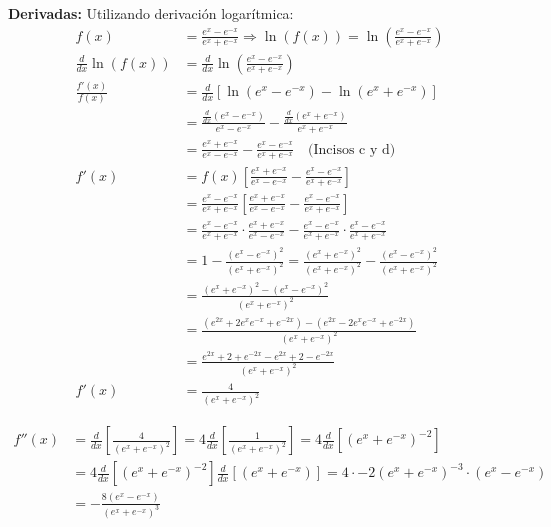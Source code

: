 \documentclass[12pt]{article}
\begin{document}
\begin{enumerate}[\hspace{9px} a)]
        \textbf{Derivadas: } \quad Utilizando derivaci\'on logar\'itmica:
            \begin{align*}
                f(x) &= \frac{e^x-e^{-x}}{e^x+e^{-x}} \Longrightarrow \ln(f(x)) = \ln\left(\frac{e^x-e^{-x}}{e^x+e^{-x}}\right)\\
                \frac{d}{dx}\ln(f(x))&=\frac{d}{dx}\ln\left(\frac{e^x-e^{-x}}{e^x+e^{-x}}\right)\\
                \frac{f'(x)}{f(x)}&=\frac{d}{dx}\left[\ln(e^x-e^{-x})-\ln(e^x+e^{-x})\right]\\
                &=\frac{\frac{d}{dx}(e^x-e^{-x})}{e^x-e^{-x}}-\frac{\frac{d}{dx}(e^x+e^{-x})}{e^x+e^{-x}}\\
                &=\frac{e^x+e^{-x}}{e^x-e^{-x}}-\frac{e^x-e^{-x}}{e^x+e^{-x}} \quad \text{(Incisos c y d)}\\
                f'(x)&= f(x)\left[\frac{e^x+e^{-x}}{e^x-e^{-x}}-\frac{e^x-e^{-x}}{e^x+e^{-x}}\right]\\
                &= \frac{e^x-e^{-x}}{e^x+e^{-x}}\left[\frac{e^x+e^{-x}}{e^x-e^{-x}}-\frac{e^x-e^{-x}}{e^x+e^{-x}}\right]\\
                &= \frac{e^x-e^{-x}}{e^x+e^{-x}}\cdot\frac{e^x+e^{-x}}{e^x-e^{-x}} - \frac{e^x-e^{-x}}{e^x+e^{-x}}\cdot\frac{e^x-e^{-x}}{e^x+e^{-x}}\\
                &= 1- \frac{(e^x-e^{-x})^2}{(e^x+e^{-x})^2} = \frac{(e^x+e^{-x})^2}{(e^x+e^{-x})^2} - \frac{(e^x-e^{-x})^2}{(e^x+e^{-x})^2}\\
                &= \frac{(e^x+e^{-x})^2-(e^x-e^{-x})^2}{(e^x+e^{-x})^2}\\
                &= \frac{(e^{2x}+2e^xe^{-x}+e^{-2x})-(e^{2x}-2e^xe^{-x}+e^{-2x})}{(e^x+e^{-x})^2}\\
                &= \frac{e^{2x}+2+e^{-2x}-e^{2x}+2-e^{-2x}}{(e^x+e^{-x})^2}\\
                f'(x)&= \frac{4}{(e^x+e^{-x})^2}
            \end{align*}

            \begin{align*}
                f''(x) &= \frac{d}{dx}\left[\frac{4}{(e^x+e^{-x})^2}\right] = 4\frac{d}{dx}\left[\frac{1}{(e^x+e^{-x})^2}\right] = 4 \frac{d}{dx}\left[(e^x+e^{-x})^{-2}\right]\\
                &= 4\frac{d}{dx}\left[(e^x+e^{-x})^{-2}\right]\frac{d}{dx}\left[(e^x+e^{-x})\right] = 4\cdot-2(e^x+e^{-x})^{-3}\cdot(e^x-e^{-x})\\
                &= -\frac{8(e^x-e^{-x})}{(e^x+e^{-x})^3}
            \end{align*}


\end{enumerate}
\end{document}

